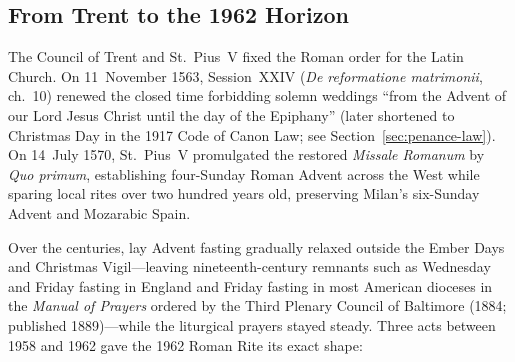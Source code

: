\subsection{From Trent to the 1962 Horizon}

The Council of Trent and St.~Pius~V fixed the Roman order for the Latin
Church. On 11~November 1563, Session~XXIV (\textit{De reformatione
matrimonii}, ch.\ 10) renewed the closed time forbidding solemn weddings
``from the Advent of our Lord Jesus Christ until the day of the Epiphany''
(later shortened to Christmas Day in the 1917 Code of Canon Law; see
Section~\ref{sec:penance-law}). On 14~July 1570, St.~Pius~V promulgated
the restored \textit{Missale Romanum} by \textit{Quo primum}, establishing
four-Sunday Roman Advent across the West while sparing local rites over two
hundred years old, preserving Milan's six-Sunday Advent and Mozarabic
Spain.

Over the centuries, lay Advent fasting gradually relaxed outside the Ember
Days and Christmas Vigil---leaving nineteenth-century remnants such as
Wednesday and Friday fasting in England and Friday fasting in most American
dioceses in the \textit{Manual of Prayers} ordered by the Third Plenary
Council of Baltimore (1884; published 1889)---while the liturgical prayers
stayed steady. Three acts between 1958 and 1962 gave the 1962 Roman Rite
its exact shape:

